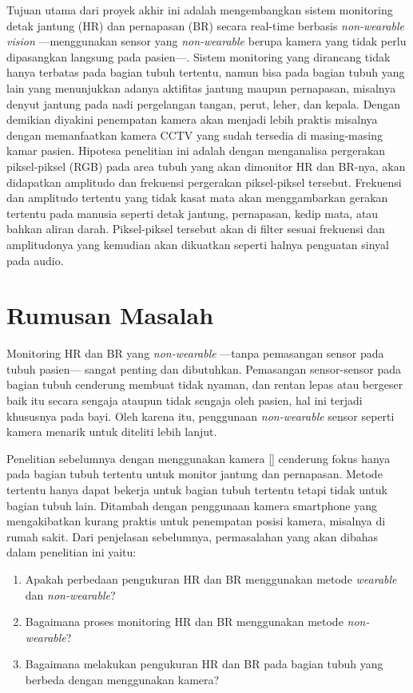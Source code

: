 Tujuan utama dari proyek akhir ini adalah mengembangkan sistem monitoring detak jantung (HR) dan pernapasan (BR) secara real-time berbasis \textit{non-wearable vision} ---menggunakan sensor yang \textit{non-wearable} berupa kamera yang tidak perlu dipasangkan langsung pada pasien---. Sistem monitoring yang dirancang tidak hanya terbatas pada bagian tubuh tertentu, namun bisa pada bagian tubuh yang lain yang menunjukkan adanya aktifitas jantung maupun pernapasan, misalnya denyut jantung pada nadi pergelangan tangan, perut, leher, dan kepala. Dengan demikian diyakini penempatan kamera akan menjadi lebih praktis misalnya dengan memanfaatkan kamera CCTV yang sudah tersedia di masing-masing kamar pasien.
Hipotesa penelitian ini adalah dengan menganalisa pergerakan piksel-piksel (RGB) pada area tubuh yang akan dimonitor HR dan BR-nya, akan didapatkan amplitudo dan frekuensi pergerakan piksel-piksel tersebut. Frekuensi dan amplitudo tertentu yang tidak kasat mata akan menggambarkan gerakan tertentu pada manusia seperti detak jantung, pernapasan, kedip mata, atau bahkan aliran darah. Piksel-piksel tersebut akan di filter sesuai frekuensi dan amplitudonya yang kemudian akan dikuatkan seperti halnya penguatan sinyal pada audio.


\section{Rumusan Masalah}  %
\label{section1.3}

Monitoring HR dan BR yang \textit{non-wearable} ---tanpa pemasangan sensor pada tubuh pasien--- sangat penting dan dibutuhkan. Pemasangan sensor-sensor pada bagian tubuh cenderung membuat tidak nyaman, dan rentan lepas atau bergeser baik itu secara sengaja ataupun tidak sengaja oleh pasien, hal ini terjadi khususnya pada bayi. Oleh karena itu, penggunaan \textit{non-wearable} sensor seperti kamera menarik untuk diteliti lebih lanjut.

Penelitian sebelumnya dengan menggunakan kamera [\citet{lazaro2014,nam2014}] cenderung fokus hanya pada bagian tubuh tertentu untuk monitor jantung dan pernapasan. Metode tertentu hanya dapat bekerja untuk bagian tubuh tertentu tetapi tidak untuk bagian tubuh lain. Ditambah dengan penggunaan kamera smartphone yang mengakibatkan kurang praktis untuk penempatan posisi kamera, misalnya di rumah sakit. Dari penjelasan sebelumnya, permasalahan yang akan dibahas dalam penelitian ini yaitu:
\begin{enumerate}
\item Apakah perbedaan pengukuran HR dan BR menggunakan metode \textit{wearable} dan \textit{non-wearable}?
\item Bagaimana proses monitoring HR dan BR menggunakan metode \textit{non-wearable}?
\item Bagaimana melakukan pengukuran HR dan BR pada bagian tubuh yang berbeda dengan menggunakan kamera?

 
\end{enumerate}

